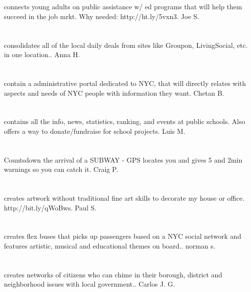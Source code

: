 \section{}connects young adults on public assistance w/ ed programs that will help them succeed in the job mrkt. Why needed: http://ht.ly/5vxn3. Joe S.
\section{}  consolidates all of the local daily deals from sites like Groupon,  LivingSocial,  etc. in one location.. Anna H.
\section{}contain a administrative portal dedicated to NYC,  that will directly relates with aspects and needs of NYC people with information they want. Chetan B.
\section{}contains all the info,  news,  statistics,  ranking,  and events at public schools. Also offers a way to donate/fundraise for school projects. Luis M.
\section{}Countsdown the arrival of a SUBWAY - GPS locates you and gives 5 and 2min warnings so you can catch it. Craig P.
\section{}creates artwork without traditional fine art skills to decorate my house or office. http://bit.ly/qWoBws. Paul S.
\section{}creates flex buses that picks up passengers based on a NYC social network and features artistic,  musical  and educational themes on board.. norman s.
\section{}creates networks of citizens who can chime in their borough,  district and neighborhood issues with local government.. Carlos J.  G.
